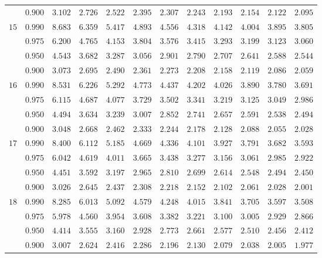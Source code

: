 \documentclass[11pt]{article}
\theoremstyle{definition}
\begin{document}
\begin{table}[H]
\begin{tabularx}{\linewidth}{c | c | c c c c c c c c c c}
		& $0.900$ & $3.102$ & $2.726$ & $2.522$ & $2.395$ & $2.307$ & $2.243$ & $2.193$ & $2.154$ & $2.122$ & $2.095$ \\
		$15$ & $0.990$ & $8.683$ & $6.359$ & $5.417$ & $4.893$ & $4.556$ & $4.318$ & $4.142$ & $4.004$ & $3.895$ & $3.805$ \\
		& $0.975$ & $6.200$ & $4.765$ & $4.153$ & $3.804$ & $3.576$ & $3.415$ & $3.293$ & $3.199$ & $3.123$ & $3.060$ \\
		& $0.950$ & $4.543$ & $3.682$ & $3.287$ & $3.056$ & $2.901$ & $2.790$ & $2.707$ & $2.641$ & $2.588$ & $2.544$ \\
		& $0.900$ & $3.073$ & $2.695$ & $2.490$ & $2.361$ & $2.273$ & $2.208$ & $2.158$ & $2.119$ & $2.086$ & $2.059$ \\
		$16$ & $0.990$ & $8.531$ & $6.226$ & $5.292$ & $4.773$ & $4.437$ & $4.202$ & $4.026$ & $3.890$ & $3.780$ & $3.691$ \\
		& $0.975$ & $6.115$ & $4.687$ & $4.077$ & $3.729$ & $3.502$ & $3.341$ & $3.219$ & $3.125$ & $3.049$ & $2.986$ \\
		& $0.950$ & $4.494$ & $3.634$ & $3.239$ & $3.007$ & $2.852$ & $2.741$ & $2.657$ & $2.591$ & $2.538$ & $2.494$ \\
		& $0.900$ & $3.048$ & $2.668$ & $2.462$ & $2.333$ & $2.244$ & $2.178$ & $2.128$ & $2.088$ & $2.055$ & $2.028$ \\
		$17$ & $0.990$ & $8.400$ & $6.112$ & $5.185$ & $4.669$ & $4.336$ & $4.101$ & $3.927$ & $3.791$ & $3.682$ & $3.593$ \\
		& $0.975$ & $6.042$ & $4.619$ & $4.011$ & $3.665$ & $3.438$ & $3.277$ & $3.156$ & $3.061$ & $2.985$ & $2.922$ \\
		& $0.950$ & $4.451$ & $3.592$ & $3.197$ & $2.965$ & $2.810$ & $2.699$ & $2.614$ & $2.548$ & $2.494$ & $2.450$ \\
		& $0.900$ & $3.026$ & $2.645$ & $2.437$ & $2.308$ & $2.218$ & $2.152$ & $2.102$ & $2.061$ & $2.028$ & $2.001$ \\
		$18$ & $0.990$ & $8.285$ & $6.013$ & $5.092$ & $4.579$ & $4.248$ & $4.015$ & $3.841$ & $3.705$ & $3.597$ & $3.508$ \\
		& $0.975$ & $5.978$ & $4.560$ & $3.954$ & $3.608$ & $3.382$ & $3.221$ & $3.100$ & $3.005$ & $2.929$ & $2.866$ \\
		& $0.950$ & $4.414$ & $3.555$ & $3.160$ & $2.928$ & $2.773$ & $2.661$ & $2.577$ & $2.510$ & $2.456$ & $2.412$ \\
		& $0.900$ & $3.007$ & $2.624$ & $2.416$ & $2.286$ & $2.196$ & $2.130$ & $2.079$ & $2.038$ & $2.005$ & $1.977$ \\

\end{tabularx}
\end{table}
\end{document}

